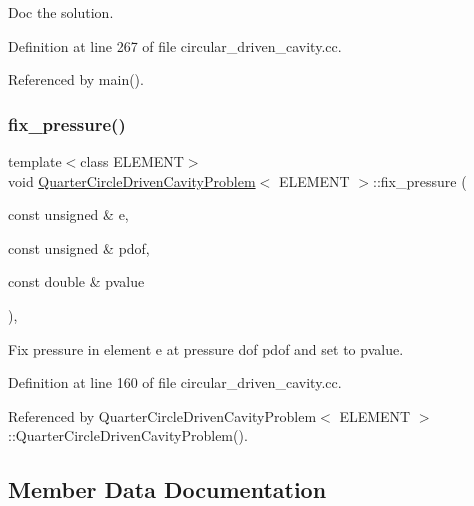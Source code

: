 Doc the solution. 



Definition at line 267 of file circular\+\_\+driven\+\_\+cavity.\+cc.



Referenced by main().

\mbox{\label{classQuarterCircleDrivenCavityProblem_a0c4e0cb1a4fb12053142fa43f899a5b1}} 
\subsubsection{\texorpdfstring{fix\+\_\+pressure()}{fix\_pressure()}}
{\footnotesize\ttfamily template$<$class E\+L\+E\+M\+E\+NT$>$ \\
void \hyperlink{classQuarterCircleDrivenCavityProblem}{Quarter\+Circle\+Driven\+Cavity\+Problem}$<$ E\+L\+E\+M\+E\+NT $>$\+::fix\+\_\+pressure (\begin{DoxyParamCaption}\item[{const unsigned \&}]{e,  }\item[{const unsigned \&}]{pdof,  }\item[{const double \&}]{pvalue }\end{DoxyParamCaption})\hspace{0.3cm}{\ttfamily [inline]}, {\ttfamily [private]}}



Fix pressure in element e at pressure dof pdof and set to pvalue. 



Definition at line 160 of file circular\+\_\+driven\+\_\+cavity.\+cc.



Referenced by Quarter\+Circle\+Driven\+Cavity\+Problem$<$ E\+L\+E\+M\+E\+N\+T $>$\+::\+Quarter\+Circle\+Driven\+Cavity\+Problem().



\subsection{Member Data Documentation}
\mbox{\label{classQuarterCircleDrivenCavityProblem_a66bd39fdcb467ebdb6afe9446d4566f3}} 
